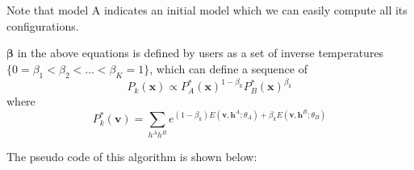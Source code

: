 Note that model A indicates an initial model which we can easily compute all its configurations.

$\mathbf \beta$ in the above equations is defined by users as a set of inverse temperatures $\{0= \beta_{1} < \beta_{2} < ... < \beta_{K} =1\}$, which can define a sequence of
\begin{equation}
P_{k}(\mathbf x) \propto P_{A}^{*}(\mathbf x)^{1-\beta_{k}} P_{B}^{*}(\mathbf x)^{\beta_{k}}
\end{equation}
where 
\begin{equation}
P^{*}_{k}(\mathbf v)=\sum_{h^{A}h^{B}}e^{(1-\beta_{k})E(\mathbf v, \mathbf h^{A};\theta_{A})+\beta_{k}E(\mathbf v,\mathbf h^{B};\theta_{B})}
\end{equation}


The pseudo code of this algorithm is shown below:

